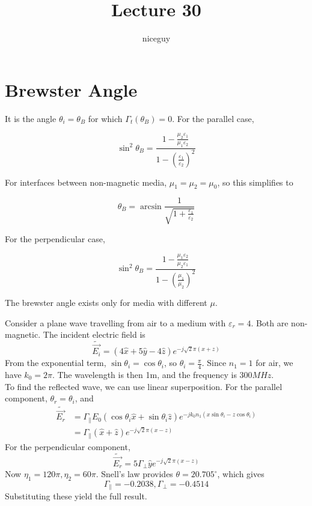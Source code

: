 \documentclass[12pt]{article}
\title{Lecture 30}
\author{niceguy}
\begin{document}
\maketitle

\section{Brewster Angle}

It is the angle $\theta_i = \theta_B$ for which $\Gamma_t(\theta_B) = 0$. For the parallel case,

$$\sin^2\theta_B = \frac{1 - \frac{\mu_2\varepsilon_1}{\mu_1\varepsilon_2}}{1 - \left(\frac{\varepsilon_1}{\varepsilon_2}\right)^2}$$

For interfaces between non-magnetic media, $\mu_1 = \mu_2 = \mu_0$, so this simplifies to

$$\theta_B = \arcsin\frac{1}{\sqrt{1 + \frac{\varepsilon_1}{\varepsilon_2}}}$$

For the perpendicular case,

$$\sin^2\theta_B = \frac{1 - \frac{\mu_1\varepsilon_2}{\mu_2\varepsilon_1}}{1 - \left(\frac{\mu_1}{\mu_2}\right)^2}$$

The brewster angle exists only for media with different $\mu$.

\begin{ex}
    Consider a plane wave travelling from air to a medium with $\varepsilon_r = 4$. Both are non-magnetic. The incident electric field is
    $$\tilde{\vec{E_i}} = (4\hat x + 5\hat y - 4\hat z) e^{-j\sqrt{2}\pi(x+z)}$$
    From the exponential term, $\sin\theta_i = \cos\theta_i$, so $\theta_i = \frac{\pi}{4}$. Since $n_1 = 1$ for air, we have $k_0 = 2\pi$. The wavelength is then 1m, and the frequency is $300\unit{MHz}$. \\
    To find the reflected wave, we can use linear superposition. For the parallel component, $\theta_r = \theta_i$, and
    \begin{align*}
        \tilde{\vec{E_r}} &= \Gamma_\parallel E_0(\cos\theta_i\hat x + \sin\theta_i\hat z)e^{-jk_0n_1(x\sin\theta_i - z\cos\theta_i)} \\
                         &= \Gamma_\parallel (\hat x + \hat z)e^{-j\sqrt{2}\pi(x-z)}
    \end{align*}
    For the perpendicular component,
    $$\tilde{\vec{E_r}} = 5\Gamma_\perp \hat y e^{-j\sqrt{2}\pi(x-z)}$$
    Now $\eta_1 = 120\pi, \eta_2 = 60\pi$. Snell's law provides $\theta = 20.705^\circ$, which gives
    $$\Gamma_\parallel = -0.2038, \Gamma_\perp = -0.4514$$
    Substituting these yield the full result.
\end{ex}
\end{document}
